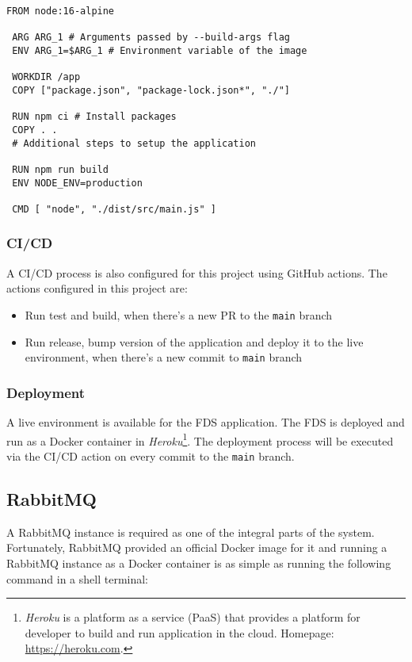    \begin{lstlisting}[caption={Dockerfile for FDS (Docker)}, language=docker]
 FROM node:16-alpine

 ARG ARG_1 # Arguments passed by --build-args flag
 ENV ARG_1=$ARG_1 # Environment variable of the image

 WORKDIR /app
 COPY ["package.json", "package-lock.json*", "./"]

 RUN npm ci # Install packages
 COPY . .
 # Additional steps to setup the application

 RUN npm run build
 ENV NODE_ENV=production

 CMD [ "node", "./dist/src/main.js" ]
   \end{lstlisting}
  
  \subsubsection{CI/CD}
  A CI/CD process is also configured for this project using GitHub actions. The actions configured in this project are:

   \begin{itemize}
    \item Run test and build, when there's a new PR to the \verb;main; branch
    \item Run release, bump version of the application and deploy it to the live environment, when there's a new commit to \verb;main; branch
   \end{itemize}
   
  \subsubsection{Deployment}
  A live environment is available for the FDS application. The FDS is deployed and run as a Docker container in \emph{Heroku}\footnote{\emph{Heroku} is a platform as a service (PaaS) that provides a platform for developer to build and run application in the cloud. Homepage: \url{https://heroku.com}.}. The deployment process will be executed via the CI/CD action on every commit to the \verb;main; branch. 

 \subsection{RabbitMQ}
 A RabbitMQ instance is required as one of the integral parts of the system. Fortunately, RabbitMQ provided an official Docker image for it and running a RabbitMQ instance as a Docker container is as simple as running the following command in a shell terminal:

